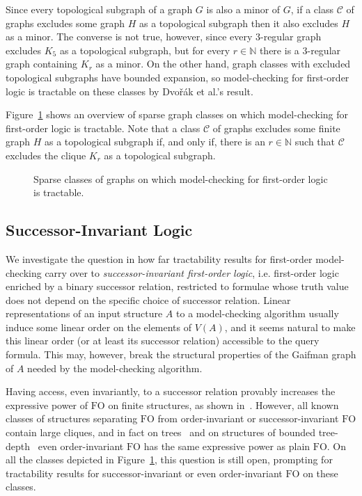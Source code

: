 \documentclass[12pt]{amsart}
\newcommand{\FO}{\textrm{FO}}
\newcommand{\N}{\mathds{N}}
\newcommand{\CCC}{\mathcal{C}} \newcommand{\DDD}{\mathcal{D}}
\begin{document}
Since every topological subgraph of a graph $G$ is also a minor of
$G$, if a class $\CCC$ of graphs excludes some graph $H$ as a
topological subgraph then it also excludes $H$ as a minor. The
converse is not true, however, since every $3$-regular graph excludes
$K_5$ as a topological subgraph, but for every $r \in \N$ there is a
$3$-regular graph containing $K_r$ as a minor. On the other hand,
graph classes with excluded topological subgraphs have bounded
expansion, so model-checking for first-order logic is tractable on
these classes by {Dvo\v r\'ak} et al.'s
result.

Figure~\ref{fig:sparseclasses} shows an overview of sparse graph
classes on which model-checking for first-order logic is
tractable. Note that a class $\CCC$ of graphs excludes some finite
graph $H$ as a topological subgraph if, and only if, there is an $r
\in \N$ such that $\CCC$ excludes the clique $K_r$ as a topological
subgraph.

\begin{figure}
  \begin{center}
  \end{center}
  \caption{Sparse classes of graphs on which model-checking for
    first-order logic is tractable.}
  \label{fig:sparseclasses}
\end{figure}

\subsection*{Successor-Invariant Logic}

We investigate the question in how far tractability results for
first-order model-checking carry over to \emph{successor-invariant
  first-order logic}, i.e. first-order logic enriched by a binary
successor relation, restricted to formulae whose truth value does not
depend on the specific choice of successor relation. Linear
representations of an input structure $A$ to a model-checking
algorithm usually induce some linear order on the elements of $V(A)$,
and it seems natural to make this linear order (or at least its
successor relation) accessible to the query formula. This may,
however, break the structural properties of the Gaifman graph of $A$
needed by the model-checking algorithm.

Having access, even invariantly, to a successor relation provably
increases the expressive power of $\FO$ on finite structures, as shown
in~\cite{Rossman07}. However, all known classes of structures
separating $\FO$ from order-invariant or successor-invariant $\FO$
contain large cliques, and in fact on trees~\cite{BenediktS09} and on
structures of bounded tree-depth~\cite{EickmeyerEH14} even
order-invariant $\FO$ has the same expressive power as plain $\FO$. On
all the classes depicted in Figure~\ref{fig:sparseclasses}, this
question is still open, prompting for tractability results for
successor-invariant or even order-invariant $\FO$ on these classes.
\end{document}
